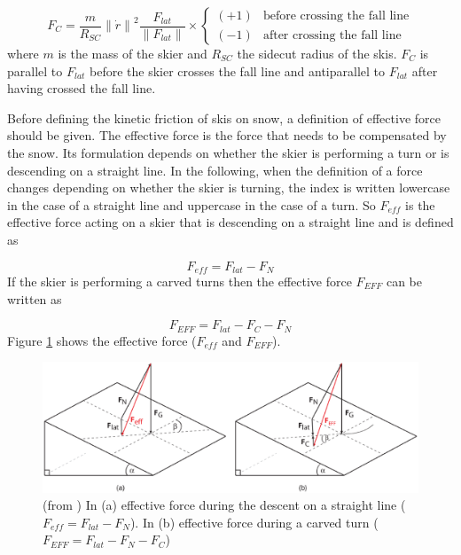 \documentclass[12pt,a4paper,twoside]{book}
\newcommand{\norm}[1]{\lVert#1\rVert}
\begin{document}
\begin{equation}
F_C=\frac{m}{R_{SC}} {\norm{\dot{r}}}^2 \frac{F_{lat}}{\norm{F_{lat}}} \times
\begin{cases}
  (+1) & \text{before crossing the fall line} \\
  (-1) & \text{after crossing the fall line}
  \end{cases}
\end{equation}
where $m$ is the mass of the skier and $R_{SC}$ the sidecut radius of the skis. $F_C$ is parallel to $F_{lat}$ before the skier crosses the fall line and antiparallel to $F_{lat}$ after having crossed the fall line.

Before defining the kinetic friction of skis on snow, a definition of effective force should be given. The effective force is the force that needs to be compensated by the snow. Its formulation depends on whether the skier is performing a turn or is descending on a straight line. In the following, when the definition of a force changes depending on whether the skier is turning, the index is written lowercase in the case of a straight line and uppercase in the case of a turn. So $F_{eff}$ is the effective force acting on a skier that is descending on a straight line and is defined as

\begin{equation}
F_{eff}=F_{lat}-F_N
\end{equation}
If the skier is performing a carved turns then the effective force $F_{EFF}$ can be written as

\begin{equation}
F_{EFF}=F_{lat}-F_C-F_N
\end{equation}
Figure \ref{effective_force_pic} shows the effective force ($F_{eff}$ and $F_{EFF}$).

\begin{figure}[!ht]
  \begin{center}
    \includegraphics[width=\textwidth]{images/figure6.eps}
    \caption{(from \cite{hol2012}) In (a) effective force during the descent on a straight line ($F_{eff}=F_{lat}-F_N$). In (b) effective force during a carved turn ($F_{EFF}=F_{lat}-F_N-F_C$)}\label{effective_force_pic}
  \end{center}
\end{figure}
\end{document}
